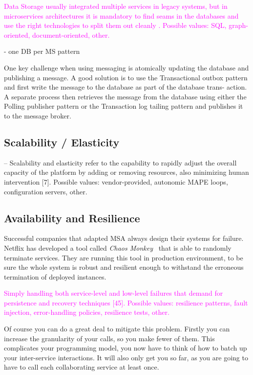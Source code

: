 \documentclass[thesis=M,english,hidelinks]{FITthesis}[2012/10/20]
\begin{document}
\textcolor{magenta}{Data Storage usually integrated multiple services in legacy systems, but in microservices architectures it is mandatory to find seams in the databases and use the right technologies to split them out cleanly \cite{ms-building-ms}. Possible values: SQL, graph-oriented, document-oriented, other.}

- one DB per MS pattern 

One key challenge when using messaging is atomically updating the database and publishing a message. A good solution is to use the Transactional outbox pattern and first write the message to the database as part of the database trans- action. A separate process then retrieves the message from the database using either the Polling publisher pattern or the Transaction log tailing pattern and publishes it to the message broker.



\subsection{Scalability / Elasticity}
\label{sec:scalability}
– Scalability and elasticity refer to the capability to rapidly adjust the overall capacity of the platform by adding or removing resources, also minimizing human intervention [7]. Possible values: vendor-provided, autonomic MAPE loops, configuration servers, other.



\subsection{Availability and Resilience}
\label{sec:resilience}
Successful companies that adapted \acrshort{MSA} always design their systems for failure. 
Netflix has developed a tool called \textit{Chaos Monkey}~\cite{chaos-monkey} that is able to randomly terminate services. They are running this tool in production environment, to be sure the whole system is robust and resilient enough to withstand the erroneous termination of deployed instances.



\textcolor{magenta}{Simply handling both service-level and low-level failures that demand for persistence and recovery techniques [45]. Possible values: resilience patterns, fault injection, error-handling policies, resilience tests, other.}



Of course you can do a great deal to mitigate this problem. Firstly you can increase the granularity of your calls, so you make fewer of them. This complicates your programming model, you now have to think of how to batch up your inter-service interactions. It will also only get you so far, as you are going to have to call each collaborating service at least once.
\end{document}
